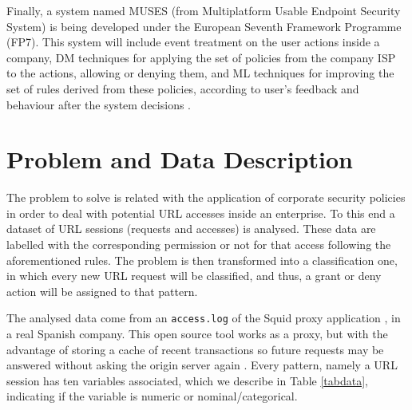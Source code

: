 \documentclass{llncs}
\begin{document}
Finally, a system named MUSES (from Multiplatform Usable Endpoint
Security System) \cite{MUSES_SAC_14} is being developed under the
European Seventh Framework Programme (FP7). This system will include
event treatment on the user actions inside a company, DM techniques
for applying the set of policies from the company ISP to the actions,
allowing or denying them, and ML techniques for improving the set of
rules derived from these policies, according to user's feedback and
behaviour after the system decisions \cite{muses_sotics_13}.  


%

\section{Problem and Data Description} 
\label{sec:problemDescription}

\noindent The problem to solve is related with the application of corporate security policies in order to deal with potential URL accesses inside an enterprise. To this end a dataset of URL sessions (requests and accesses) is analysed. These data are labelled with the corresponding permission or not for that access following the aforementioned rules. The problem is then transformed into a classification one, in which every new URL request will be classified, and thus, a grant or deny action will be assigned to that pattern.

The analysed data come from an \texttt{access.log} of the Squid
proxy application
\cite{squid:site}, in a real Spanish company. This open source tool
works as a proxy, but with the advantage of storing a cache of recent
transactions so future requests may be answered without asking the
origin server again \cite{DuaneWessels2004}.  
Every pattern, namely a URL session has ten variables associated,
which we describe in Table \ref{tabdata}, indicating if the variable
is numeric or nominal/categorical. 
\end{document}
